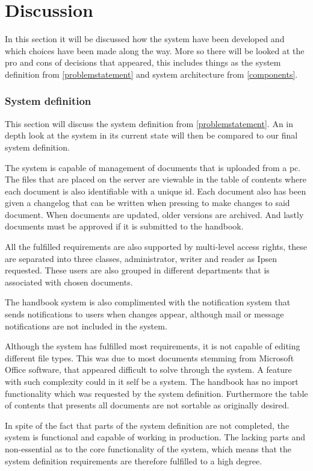 \chapter{Discussion}
In this section it will be discussed how the system have been developed and which choices have been made along the way. More so there will be looked at the pro and cons of decisions that appeared, this includes things as the system definition from \cref{problemstatement} and system architecture from \cref{components}.

\subsection{System definition}
This section will discuss the system definition from \cref{problemstatement}. An in depth look at the system in its current state will then be compared to our final system definition.

The system is capable of management of documents that is uploaded from a pc. The files that are placed on the server are viewable in the table of contents where each document is also identifiable with a unique id. Each document also has been given a changelog that can be written when pressing to make changes to said document. When documents are updated, older versions are archived. And lastly documents must be approved if it is submitted to the handbook.

All the fulfilled requirements are also supported by multi-level access rights, these are separated into three classes, administrator, writer and reader as Ipsen requested. These users are also grouped in different departments that is associated with chosen documents. 

The handbook system is also complimented with the notification system that sends notifications to users when changes appear, although mail or message notifications are not included in the system.

Although the system has fulfilled most requirements, it is not capable of editing different file types. This was due to most documents stemming from Microsoft Office software, that appeared difficult to solve through the system. A feature with such complexity could in it self be a system. The handbook has no import functionality which was requested by the system definition. Furthermore the table of contents that presents all documents are not sortable as originally desired.

In spite of the fact that parts of the system definition are not completed, the system is functional and capable of working in production. The lacking parts and non-essential as to the core functionality of the system, which means that the system definition requirements are therefore fulfilled to a high degree.


